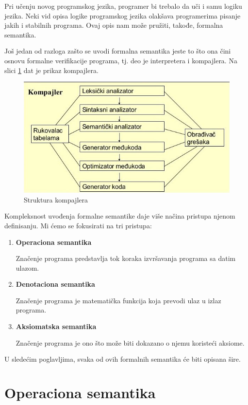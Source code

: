 \documentclass[a4paper]{article}
\begin{document}
{Pri učenju novog programskog jezika, programer bi trebalo da uči i samu logiku jezika. Neki vid opisa logike programskog jezika olakšava programerima pisanje jakih i stabilnih programa.  Ovaj opis nam može pružiti, takođe, formalna semantika.

Još jedan od razloga zašto se uvodi formalna semantika jeste to što ona čini osnovu formalne verifikacije programa, tj. deo je interpretera i kompajlera. Na slici \ref{fig:kompajler} dat je prikaz kompajlera.

\begin{figure}[h!]
\begin{center}
\includegraphics[scale=0.5]{kompajler.jpg}
\end{center}
\caption{Struktura kompajlera \cite{slika}}
\label{fig:kompajler}
\end{figure}

Kompleksnost uvođenja formalne semantike daje više načina pristupa njenom definisanju. Mi ćemo se fokusirati na tri pristupa:
\begin{enumerate}
  \item \textbf{Operaciona semantika}

  Značenje programa predstavlja tok koraka izvršavanja programa sa datim ulazom.
  \item \textbf{Denotaciona semantika}

  Značenje programa je matematička funkcija koja prevodi ulaz u izlaz programa.
  \item \textbf{Aksiomatska semantika}

  Značenje programa je ono što može biti dokazano o njemu koristeći aksiome.
\end{enumerate}

U sledećim poglavljima, svaka od ovih formalnih semantika će biti opisana šire.
\section{Operaciona semantika}
\label{sec:opsem}

}
\end{document}
